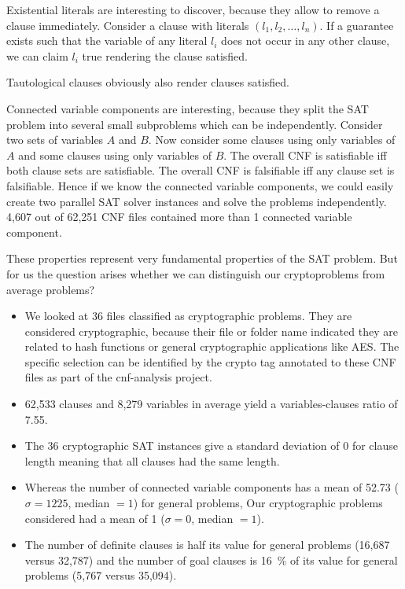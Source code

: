 Existential literals are interesting to discover, because they allow
to remove a clause immediately. Consider a clause with literals
$(l_1, l_2, \ldots, l_n)$. If a guarantee exists such that the variable
of any literal $l_i$ does not occur in any other clause, we can claim
$l_i$ true rendering the clause satisfied.

Tautological clauses obviously also render clauses satisfied.

Connected variable components are interesting, because they split the
SAT problem into several small subproblems which can be independently.
Consider two sets of variables $A$ and $B$. Now consider some clauses
using only variables of $A$ and some clauses using only variables of $B$.
The overall CNF is satisfiable iff both clause sets are satisfiable.
The overall CNF is falsifiable iff any clause set is falsifiable.
Hence if we know the connected variable components, we could easily
create two parallel SAT solver instances and solve the problems
independently. 4,607 out of 62,251 CNF files contained more than 1
connected variable component.

These properties represent very fundamental properties of the SAT problem.
But for us the question arises whether we can distinguish our cryptoproblems
from average problems?

\begin{itemize}
\item We looked at 36 files classified as cryptographic problems.
  They are considered cryptographic, because their file or folder name
  indicated they are related to hash functions or general cryptographic
  applications like AES. The specific selection can be identified by
  the crypto tag annotated to these CNF files as part of the cnf-analysis
  project.
\item 62,533 clauses and 8,279 variables in average yield a variables-clauses
  ratio of 7.55.
\item The 36 cryptographic SAT instances give a standard deviation of 0
  for clause length meaning that all clauses had the same length.
\item Whereas the number of connected variable components has a mean
  of 52.73 ($\sigma = 1225$, median $= 1$) for general problems,
  Our cryptographic problems considered had a mean of 1 ($\sigma = 0$, median $= 1$).
\item The number of definite clauses is half its value for general problems
  (16,687 versus 32,787) and the number of goal clauses is 16~\% of its
  value for general problems (5,767 versus 35,094).
\end{itemize}

